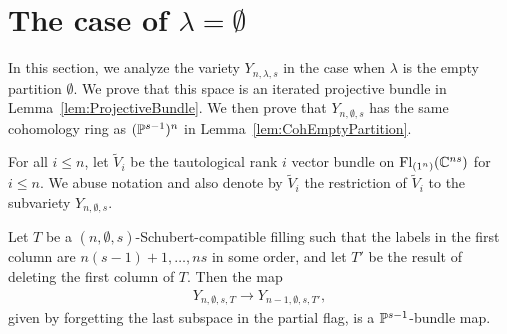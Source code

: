 \documentclass[12pt]{amsart}
\newcommand{\Fl}{\mathrm{Fl}}
\begin{document}
\section{The case of $\lambda = \emptyset$}\label{sec:EmptyPartition}

In this section, we analyze the variety $Y_{n,\lambda,s}$ in the case when $\lambda$ is the empty partition $\emptyset$. We prove that this space is an iterated projective bundle in Lemma~\ref{lem:ProjectiveBundle}. We then prove that $Y_{n,\emptyset,s}$ has the same cohomology ring as $(\mathbb{P}^{s-1})^n$ in Lemma~\ref{lem:CohEmptyPartition}.

For all $i\leq n$, let $\widetilde V_i$ be the tautological rank $i$ vector bundle on $\Fl_{(1^n)}(\bC^{ns})$ for $i\leq n$. We abuse notation and also denote by $\widetilde V_i$ the restriction of $\widetilde V_i$ to the subvariety $Y_{n,\emptyset,s}$. 

\begin{lemma}\label{lem:ProjectiveBundle}
Let $T$ be a $(n,\emptyset,s)$-Schubert-compatible filling such that the labels in the first column are $n(s-1)+1,\dots, ns$ in some order, and let $T'$ be the result of deleting the first column of $T$. Then the map
\begin{align}\label{eq:ForgettingMap}
Y_{n,\emptyset,s,T} \rightarrow Y_{n-1,\emptyset,s,T'},
\end{align}
given by forgetting the last subspace in the partial flag, is a $\mathbb{P}^{s-1}$-bundle map.
\end{lemma}
\end{document}
